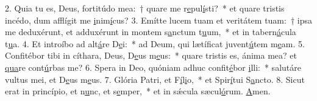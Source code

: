 2. Quia tu es, Deus, fortitúdo mea:~† quare me r\uline{e}pul\uline{í}sti?~* et quare tristis incédo, dum afflígit me \uline{i}nim\uline{í}cus?
3. Emítte lucem tuam et veritátem tuam:~† ipsa me deduxérunt, et adduxérunt in montem s\uline{a}nctum t\uline{u}um,~* et in tabern\uline{á}cula t\uline{u}a.
4. Et introíbo ad alt\uline{á}re D\uline{e}i:~* ad Deum, qui lætíficat juvent\uline{ú}tem m\uline{e}am.
5. Confitébor tibi in cíthara, Deus, D\uline{e}us m\uline{e}us:~* quare tristis es, ánima mea? et \uline{qua}re cont\uline{ú}rbas me?
6. Spera in Deo, quóniam adhuc confit\uline{é}bor \uline{i}lli:~* salutáre vultus mei, et D\uline{e}us m\uline{e}us.
7. Glória Patri, et F\uline{í}l\uline{i}o,~* et Spir\uline{í}tui S\uline{a}ncto.
8. Sicut erat in princípio, et n\uline{u}nc, et s\uline{e}mper,~* et in sǽcula sæcul\uline{ó}rum. \uline{A}men.
